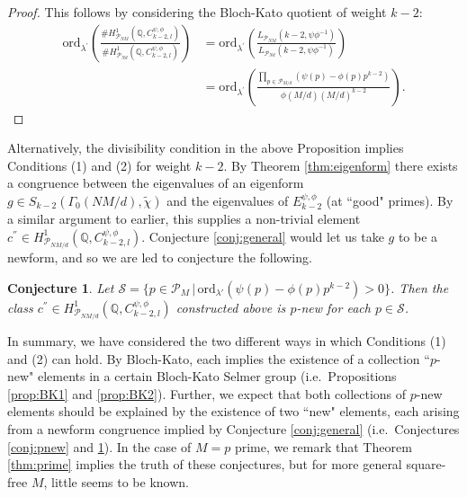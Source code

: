 \documentclass{amsart}
\theoremstyle{plain}
\newtheorem{conj}[theorem]{Conjecture}
\theoremstyle{definition}
\begin{document}
    \begin{proof}
    This follows by considering the Bloch-Kato quotient of weight $k-2$: \begin{align*}\text{ord}_{\lambda^\prime}\left( \frac{ \#H^1_{\mathcal{P}_{NM}}(\mathbb{Q},C_{k-2,l}^{\psi,\phi})}{\#H^1_{\mathcal{P}_{Nd}}(\mathbb{Q},C_{k-2,l}^{\psi,\phi})}\right) &= \text{ord}_{\lambda^\prime}\left( \frac{L_{\mathcal{P}_{NM}}(k-2, \psi\phi^{-1})}{L_{\mathcal{P}_{Nd}}(k-2, \psi\phi^{-1})} \right)\\ &=\text{ord}_{\lambda^\prime}\left( \frac{\prod_{p \in \mathcal{P}_{M/d}}(\psi(p)-\phi(p)p^{k-2})}{\phi(M/d)(M/d)^{k-2}}\right).\end{align*}
    \end{proof}

    Alternatively, the divisibility condition in the above Proposition implies Conditions (1) and (2) for weight $k-2$. By Theorem \ref{thm:eigenform} there exists a congruence between the eigenvalues of an eigenform $g\in S_{k-2}(\Gamma_0(NM/d),\tilde{\chi})$ and the eigenvalues of $E_{k-2}^{\psi,\phi}$ (at ``good" primes). By a similar argument to earlier, this supplies a non-trivial element $c^{''}\in H^1_{\mathcal{P}_{NM/d}}(\mathbb{Q},C_{k-2,l}^{\psi,\phi})$. Conjecture \ref{conj:general} would let us take $g$ to be a newform, and so we are led to conjecture the following.

    \begin{conj}\label{conj:pnew2}
    Let $\mathcal{S} = \{p\in \mathcal{P}_M\,|\,\text{ord}_{\lambda'}(\psi(p)-\phi(p)p^{k-2})>0\}$. Then the class $c^{''}\in H^1_{\mathcal{P}_{NM/d}}(\mathbb{Q},C_{k-2,l}^{\psi,\phi})$ constructed above is $p$-new for each $p\in \mathcal{S}$.
    \end{conj}

    \noindent In summary, we have considered the two different ways in which Conditions (1) and (2) can hold. By Bloch-Kato, each implies the existence of a collection ``$p$-new" elements in a certain Bloch-Kato Selmer group (i.e.\ Propositions \ref{prop:BK1} and \ref{prop:BK2}). Further, we expect that both collections of $p$-new elements should be explained by the existence of two ``new" elements, each arising from a newform congruence implied by Conjecture \ref{conj:general} (i.e.\ Conjectures \ref{conj:pnew} and \ref{conj:pnew2}).  In the case of $M=p$ prime, we remark that Theorem \ref{thm:prime} implies the truth of these conjectures, but for more general square-free $M$, little seems to be known.
\end{document}
